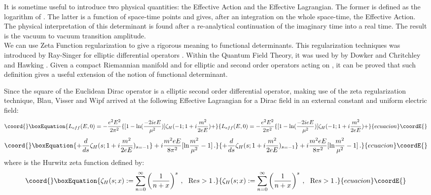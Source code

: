 \documentclass [11pt]{article}
\begin{document}
It is sometime useful to introduce two physical quantities: the Effective Action and the Effective Lagrangian.
The former is defined  as the logarithm of \coordHE{}. The latter is a function of space-time points
and gives, after an integration on the whole space-time, the Effective Action.
The physical interpretation of this determinant is found after a re-analytical continuation of the imaginary time into a real time.
The result is the vacuum to vacuum transition amplitude.\\ 

We can use Zeta Function regularization to give a rigorous meaning to 
functional  determinants. This regularization techniques was introduced
by Ray-Singer for elliptic differential operators \cite{13}. Within the 
Quantum  Field Theory, it was used by by 
 Dowker and Chritchley \cite{Dowker:1977zf}  and Hawking
\cite{Hawking:1977ja}. Given a  compact Riemannian manifold \coordHE{} and for  elliptic and second order operators acting on \coordHE{},  it can be proved that such
 definition gives a useful extension of the notion of functional determinant.


 Since the square of the Euclidean Dirac operator is a elliptic second order 
 differential operator, making  use of the zeta regularization 
technique, Blau, Visser and Wipf \cite{Blau:1991iz} arrived at the following 
Effective Lagrangian for a Dirac field in an external constant and uniform electric field:
\begin{equation}\coord{}\boxEquation{
\label{leff}
L_{eff}(E,0)=-\frac{e^{2}E^{2}}{2\pi ^{2}}\{[1-\mbox{ln}
(\frac{-2ieE}{\mu ^{2}})]\zeta _{H}(-1;1+i\frac{m^{2}}{2eE})+
}{
L_{eff}(E,0)=-\frac{e^{2}E^{2}}{2\pi ^{2}}\{[1-\mbox{ln}
(\frac{-2ieE}{\mu ^{2}})]\zeta _{H}(-1;1+i\frac{m^{2}}{2eE})+
}{ecuacion}\coordE{}\end{equation}
\begin{equation}\coord{}\boxEquation{\nonumber
+\frac{d}{ds}\zeta _{H}(s;1+i\frac{m^{2}}{2eE})_{s=-1}\}+i\frac{m^{2}eE}{8\pi ^{2}}[\mbox{ln}\frac{m^{2}}{\mu ^{2}}-1]\, .
}{\nonumber
+\frac{d}{ds}\zeta _{H}(s;1+i\frac{m^{2}}{2eE})_{s=-1}\}+i\frac{m^{2}eE}{8\pi ^{2}}[\mbox{ln}\frac{m^{2}}{\mu ^{2}}-1]\, .
}{ecuacion}\coordE{}\end{equation}
  where \coordHE{} is the Hurwitz zeta function defined by:
\begin{equation}\coord{}\boxEquation{\nonumber
\zeta_{H}(s;x):=\sum^{\infty}_{n=0}\left(\frac{1}{n+x}\right)^s\:,\,\,\,\,
\mbox{Re}s>1 \,.
}{\nonumber
\zeta_{H}(s;x):=\sum^{\infty}_{n=0}\left(\frac{1}{n+x}\right)^s\:,\,\,\,\,
\mbox{Re}s>1 \,.
}{ecuacion}\coordE{}\end{equation}
   
\end{document}
